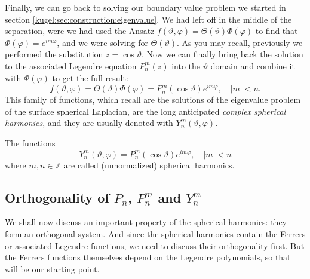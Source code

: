 Finally, we can go back to solving our boundary value problem we started in
section \ref{kugel:sec:construction:eigenvalue}. We had left off in the middle
of the separation, were we had used the Ansatz $f(\vartheta, \varphi) =
\Theta(\vartheta) \Phi(\varphi)$ to find that $\Phi(\varphi) = e^{im\varphi}$,
and we were solving for $\Theta(\vartheta)$.  As you may recall, previously we
performed the substitution $z = \cos \vartheta$. Now we can finally bring back the
solution to the associated Legendre equation $P^m_n(z)$ into the $\vartheta$
domain and combine it with $\Phi(\varphi)$ to get the full result:
\begin{equation*}
    f(\vartheta, \varphi)
      = \Theta(\vartheta)\Phi(\varphi)
      = P^m_n (\cos \vartheta) e^{im\varphi}, \quad |m|<n.
\end{equation*}
This family of functions, which recall are the solutions of the eigenvalue
problem of the surface spherical Laplacian, are the long anticipated
\emph{complex spherical harmonics}, and they are usually denoted with
$Y^m_n(\vartheta, \varphi)$.

\begin{definition}
  \label{kugel:def:spherical-harmonics}
  The functions
  \begin{equation*}
    Y^m_n (\vartheta, \varphi) = P^m_n(\cos \vartheta) e^{im\varphi}, \quad |m|<n
  \end{equation*}
  where $m, n \in \mathbb{Z}$ are called (unnormalized) spherical
  harmonics.
\end{definition}

\begin{figure}
  \centering
  \kugelplaceholderfig{\textwidth}{.8\paperheight}
  \caption{
    \label{kugel:fig:spherical-harmonics}
  }
\end{figure}


\subsection{Orthogonality of $P_n$, $P^m_n$ and $Y^m_n$}

We shall now discuss an important property of the spherical harmonics: they form
an orthogonal system. And since the spherical harmonics contain the Ferrers or
associated Legendre functions, we need to discuss their orthogonality first.
But the Ferrers functions themselves depend on the Legendre polynomials, so that
will be our starting point.


